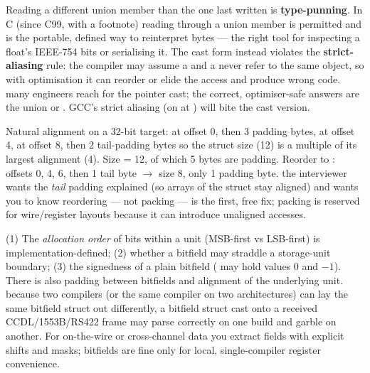 Reading a different union member than the one last written is
\textbf{type-punning}. In C (since C99, with a footnote) reading through a
union member is permitted and is the portable, defined way to reinterpret
bytes --- the right tool for inspecting a float's IEEE-754 bits or
serialising it. The cast form  instead violates the
\textbf{strict-aliasing} rule: the compiler may assume a  and a
 never refer to the same object, so with optimisation it can
reorder or elide the access and produce wrong code. \trap many engineers
reach for the pointer cast; the correct, optimiser-safe answers are the union
or . GCC's strict aliasing (on at ) will bite the cast
version.

Natural alignment on a 32-bit target:  at offset 0, then
3 padding bytes,  at offset 4,  at offset 8,
then 2 tail-padding bytes so the struct size (12) is a multiple of its
largest alignment (4). Size = 12, of which 5 bytes are padding. Reorder to
: offsets 0, 4, 6, then 1 tail byte
$\rightarrow$ size 8, only 1 padding byte. \trap the interviewer wants the
\emph{tail} padding explained (so arrays of the struct stay aligned) and
wants you to know reordering --- not packing --- is the first, free fix;
packing is reserved for wire/register layouts because it can introduce
unaligned accesses.

(1) The \emph{allocation order} of bits within a unit (MSB-first vs
LSB-first) is implementation-defined; (2) whether a bitfield may straddle a
storage-unit boundary; (3) the signedness of a plain  bitfield
( may hold values 0 and $-1$). There is also padding between
bitfields and alignment of the underlying unit. \trap because two compilers
(or the same compiler on two architectures) can lay the same bitfield struct
out differently, a bitfield struct cast onto a received CCDL/1553B/RS422
frame may parse correctly on one build and garble on another. For
on-the-wire or cross-channel data you extract fields with explicit shifts and
masks; bitfields are fine only for local, single-compiler register
convenience.

